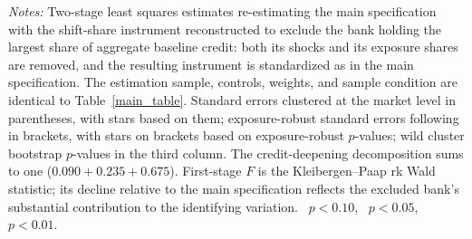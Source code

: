 \begin{threeparttable}
\begin{tablenotes}[flushleft]
        \item \textit{Notes:} Two-stage least squares estimates re-estimating the main specification with the shift-share instrument reconstructed to exclude the bank holding the largest share of aggregate baseline credit: both its shocks and its exposure shares are removed, and the resulting instrument is standardized as in the main specification. The estimation sample, controls, weights, and sample condition are identical to Table~\ref{main_table}. Standard errors clustered at the market level in parentheses, with stars based on them; exposure-robust standard errors following \citet{adao2019shiftshare} in brackets, with stars on brackets based on exposure-robust $p$-values; wild cluster bootstrap $p$-values in the third column. The credit-deepening decomposition sums to one ($0.090+0.235+0.675$). First-stage $F$ is the Kleibergen--Paap rk Wald statistic; its decline relative to the main specification reflects the excluded bank's substantial contribution to the identifying variation. \sym{*}~$p<0.10$, \sym{**}~$p<0.05$, \sym{***}~$p<0.01$.
    \end{tablenotes}
\end{threeparttable}